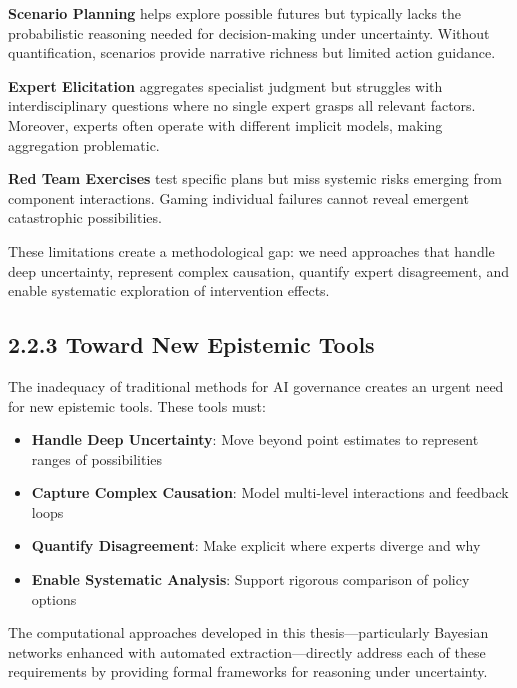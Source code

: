 \documentclass[
  11pt,
  letterpaper,
]{book}
\providecommand{\tightlist}{%
  \setlength{\itemsep}{0pt}\setlength{\parskip}{0pt}}
\begin{document}
\textbf{Scenario Planning} helps explore possible futures but typically
lacks the probabilistic reasoning needed for decision-making under
uncertainty. Without quantification, scenarios provide narrative
richness but limited action guidance.

\textbf{Expert Elicitation} aggregates specialist judgment but struggles
with interdisciplinary questions where no single expert grasps all
relevant factors. Moreover, experts often operate with different
implicit models, making aggregation problematic.

\textbf{Red Team Exercises} test specific plans but miss systemic risks
emerging from component interactions. Gaming individual failures cannot
reveal emergent catastrophic possibilities.

These limitations create a methodological gap: we need approaches that
handle deep uncertainty, represent complex causation, quantify expert
disagreement, and enable systematic exploration of intervention effects.

\subsection*{2.2.3 Toward New Epistemic
Tools}\label{sec-new-epistemic-tools}

The inadequacy of traditional methods for AI governance creates an
urgent need for new epistemic tools. These tools must:

\begin{itemize}
\tightlist
\item
  \textbf{Handle Deep Uncertainty}: Move beyond point estimates to
  represent ranges of possibilities
\item
  \textbf{Capture Complex Causation}: Model multi-level interactions and
  feedback loops
\item
  \textbf{Quantify Disagreement}: Make explicit where experts diverge
  and why
\item
  \textbf{Enable Systematic Analysis}: Support rigorous comparison of
  policy options
\end{itemize}

\begin{tcolorbox}[enhanced jigsaw, opacityback=0, leftrule=.75mm, breakable, coltitle=black, colbacktitle=quarto-callout-tip-color!10!white, bottomrule=.15mm, rightrule=.15mm, toprule=.15mm, left=2mm, bottomtitle=1mm, arc=.35mm, toptitle=1mm, titlerule=0mm, title=\textcolor{quarto-callout-tip-color}{\faLightbulb}\hspace{0.5em}{Key Insight}, opacitybacktitle=0.6, colframe=quarto-callout-tip-color-frame, colback=white]

The computational approaches developed in this thesis---particularly
Bayesian networks enhanced with automated extraction---directly address
each of these requirements by providing formal frameworks for reasoning
under uncertainty.

\end{tcolorbox}
\end{document}
